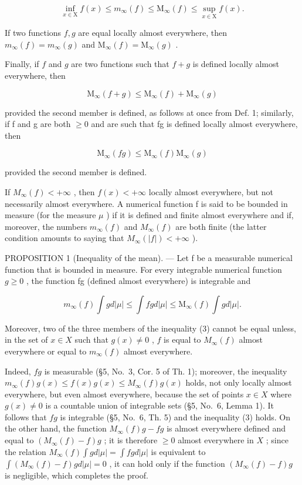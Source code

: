 \[
\inf _ {x \in \mathrm{X}} f (x) \leqslant m _ {\infty} (f) \leqslant \mathrm{M} _ {\infty} (f) \leqslant \sup _ {x \in \mathrm{X}} f (x).
\]

If two functions \(f, g\) are equal locally almost everywhere, then \(m_{\infty}(f) = m_{\infty}(g)\) and \(\mathrm{M}_{\infty}(f) = \mathrm{M}_{\infty}(g)\) .

Finally, if \(f\) and \(g\) are two functions such that \(f + g\) is defined locally almost everywhere, then

\[
\mathrm{M} _ {\infty} (f + g) \leqslant \mathrm{M} _ {\infty} (f) + \mathrm{M} _ {\infty} (g)\tag{1}
\]

provided the second member is defined, as follows at once from Def. 1; similarly, if f and g are both \(\geqslant0\) and are such that fg is defined locally almost everywhere, then

\[
\mathrm{M} _ {\infty} (f g) \leqslant \mathrm{M} _ {\infty} (f) \mathrm{M} _ {\infty} (g)\tag{2}
\]

provided the second member is defined.

If \(M_{\infty}(f) < +\infty\) , then \(f(x) < +\infty\) locally almost everywhere, but not necessarily almost everywhere. A numerical function f is said to be bounded in measure (for the measure \(\mu\) ) if it is defined and finite almost everywhere and if, moreover, the numbers \(m_{\infty}(f)\) and \(M_{\infty}(f)\) are both finite (the latter condition amounts to saying that \(M_{\infty}(|f|)<+\infty\) ).

PROPOSITION 1 (Inequality of the mean). --- Let f be a measurable numerical function that is bounded in measure. For every integrable numerical function \(g \geqslant 0\) , the function fg (defined almost everywhere) is integrable and

\[
m _ {\infty} (f) \int g d | \mu | \leqslant \int f g d | \mu | \leqslant \mathrm{M} _ {\infty} (f) \int g d | \mu |.\tag{3}
\]

Moreover, two of the three members of the inequality (3) cannot be equal unless, in the set of \(x \in X\) such that \(g(x) \neq 0\) , \(f\) is equal to \(M_{\infty}(f)\) almost everywhere or equal to \(m_{\infty}(f)\) almost everywhere.

Indeed, \(fg\) is measurable (§5, No.~3, Cor. 5 of Th. 1); moreover, the inequality \(m_{\infty}(f)g(x) \leqslant f(x)g(x) \leqslant M_{\infty}(f)g(x)\) holds, not only locally almost everywhere, but even almost everywhere, because the set of points \(x \in X\) where \(g(x) \neq 0\) is a countable union of integrable sets (§5, No.~6, Lemma 1). It follows that \(fg\) is integrable (§5, No.~6, Th. 5) and the inequality (3) holds. On the other hand, the function \(M_{\infty}(f)g - fg\) is almost everywhere defined and equal to \((M_{\infty}(f) - f)g\) ; it is therefore \(\geqslant 0\) almost everywhere in \(X\) ; since the relation \(M_{\infty}(f) \int g d|\mu| = \int fg d|\mu|\) is equivalent to \(\int(M_{\infty}(f) - f)gd|\mu| = 0\) , it can hold only if the function \((M_{\infty}(f) - f)g\) is negligible, which completes the proof.

